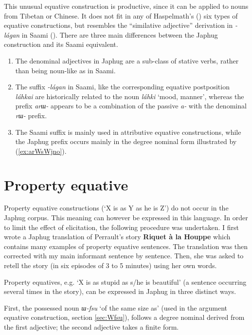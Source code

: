\documentclass[oneside,a4paper,12pt]{article}
\newcommand{\ipa}[1]{{\phon\textit{#1}}}
\newcommand{\forme}[2]{\ipa{#1} `#2'}
\begin{document}
This unusual equative construction is productive, since it can be applied to nouns from Tibetan or Chinese. It does not fit in any of Haspelmath's (\citeyear{haspelmath17equative}) six types of equative constructions, but resembles the ``similative adjective'' derivation in \ipa{-lágan} in Saami (\citealt[5.1]{ylikovski17similarity}). There are three main differences between the Japhug construction and its Saami equivalent.

\begin{enumerate}
\item The denominal adjectives in Japhug are a sub-class of stative verbs, rather than being noun-like as in Saami.
\item The suffix \ipa{-lágan} in Saami, like the corresponding equative postposition \ipa{láhkai} are historically related to the noun \ipa{láhki} ‘mood, manner’, whereas the prefix \ipa{arɯ-} appears to be a combination of the passive \ipa{a-} with the denominal \ipa{rɯ-} prefix.
\item The Saami suffix is mainly used in attributive equative constructions, while the Japhug prefix occurs mainly in the degree nominal form illustrated by (\ref{ex:arWsWjno}).
\end{enumerate}



\section{Property equative} \label{sec:pred.equative}
Property equative constructions (`X is as Y as he is Z') do not occur in the Japhug corpus. This meaning can however be expressed in this language. In order to limit the effect of elicitation, the following procedure was undertaken. I first wrote a Japhug translation of Perrault's story \textbf{Riquet à la Houppe} which contains many examples of property equative sentences. The translation was then corrected with my main informant sentence by sentence. Then, she was asked to retell the story (in six episodes of 3 to 5 minutes) using her own words.

Property equatives, e.g. `X is as stupid as s/he is beautiful' (a sentence occurring several times in the story), can be expressed in Japhug in three distinct ways.

First, the possessed noun \forme{ɯ-fsu}{of the same size as} (used in the argument equative construction, section \ref{sec:Wfsu}), follows a degree nominal derived from the first adjective; the second adjective takes a finite form.
\end{document}
